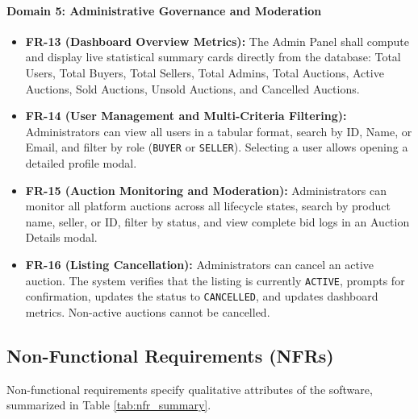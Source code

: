 \paragraph{Domain 5: Administrative Governance and Moderation}
\begin{itemize}
    \item \textbf{FR-13 (Dashboard Overview Metrics):} The Admin Panel shall compute and display live statistical summary cards directly from the database: Total Users, Total Buyers, Total Sellers, Total Admins, Total Auctions, Active Auctions, Sold Auctions, Unsold Auctions, and Cancelled Auctions.
    \item \textbf{FR-14 (User Management and Multi-Criteria Filtering):} Administrators can view all users in a tabular format, search by ID, Name, or Email, and filter by role (\texttt{BUYER} or \texttt{SELLER}). Selecting a user allows opening a detailed profile modal.
    \item \textbf{FR-15 (Auction Monitoring and Moderation):} Administrators can monitor all platform auctions across all lifecycle states, search by product name, seller, or ID, filter by status, and view complete bid logs in an Auction Details modal.
    \item \textbf{FR-16 (Listing Cancellation):} Administrators can cancel an active auction. The system verifies that the listing is currently \texttt{ACTIVE}, prompts for confirmation, updates the status to \texttt{CANCELLED}, and updates dashboard metrics. Non-active auctions cannot be cancelled.
\end{itemize}

\subsection{Non-Functional Requirements (NFRs)}
Non-functional requirements specify qualitative attributes of the software, summarized in Table \ref{tab:nfr_summary}.

